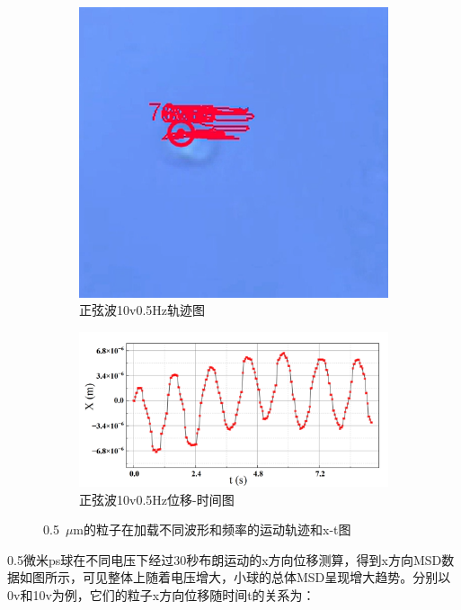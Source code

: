 \documentclass[a4paper]{report} %
\begin{document}
\begin{figure}[H]
    \begin{subfigure}{0.3\textwidth}
        \includegraphics[width=\linewidth]{sin10v0.5Hz1.png}
        \caption{正弦波10v0.5Hz轨迹图}
    \end{subfigure}
    \begin{subfigure}{0.6\textwidth}
        \includegraphics[width=\linewidth]{sin10v0.5Hz.png}
        \caption{正弦波10v0.5Hz位移-时间图}
    \end{subfigure}

    \caption{0.5~$\mu$m的粒子在加载不同波形和频率的运动轨迹和x-t图}
\end{figure}
0.5微米ps球在不同电压下经过30秒布朗运动的x方向位移测算，得到x方向MSD数据如图所示，可见整体上随着电压增大，小球的总体MSD呈现增大趋势。分别以0v和10v为例，它们的粒子x方向位移随时间t的关系为：\par
\end{document}
